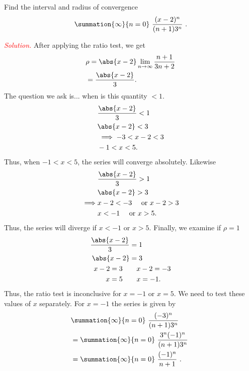 \documentclass{report}
\begin{document}
    \pagebreak \bigbreak \noindent 
    \begin{exm}
        Find the interval and radius of convergence
        \begin{align*}
            \summation{\infty}{n=0}\ \frac{(x-2)^{n}}{(n+1)3^{n}}\ 
        .\end{align*}
    \end{exm}
    \bigbreak \noindent 
    \textcolor{red}{\textit{Solution.}} After applying the ratio test, we get
    \begin{align*}
        &\rho = \abs{x-2}\lim\limits_{n \to \infty}{\frac{n+1}{3n+2}} \\
        &=\frac{\abs{x-2}}{3}
    .\end{align*}
    \bigbreak \noindent 
    The question we ask is... when is this quantity $<1 $. 
    \begin{align*}
        &\frac{\abs{x-2}}{3} < 1 \\
        &\abs{x-2} < 3 \\
        &\implies -3 < x-2 < 3 \\
        &-1 < x < 5
    .\end{align*}
    \bigbreak \noindent 
    Thus, when $-1 < x < 5$, the series will converge absolutely. Likewise
    \begin{align*}
        &\frac{\abs{x-2}}{3} > 1 \\
        &\abs{x-2} > 3 \\
        \implies &x-2 < -3 \quad \text{ or } x-2 > 3 \\
        &x < -1 \quad \text{ or } x > 5
    .\end{align*}
    \bigbreak \noindent 
    Thus, the series will diverge if $x < -1$ or $x > 5$. Finally, we examine if $\rho = 1$
    \begin{align*}
        \frac{\abs{x-2}}{3} &= 1 \\
        \abs{x-2} &= 3 \\
        x-2 = 3 \quad &\quad x-2 = -3 \\
        x=5 \quad &\quad x=-1
    .\end{align*}
    \bigbreak \noindent 
    Thus, the ratio test is inconclusive for $x = -1$ or $x=5$. We need to test these values of $x$ separately. For $x=-1$ the series is given by
    \begin{align*}
        &\summation{\infty}{n=0}\ \frac{(-3)^{n}}{(n+1)3^{n}}\  \\
        &=\summation{\infty}{n=0}\ \frac{3^{n}(-1)^{n}}{(n+1)3^{n}}\  \\
        &=\summation{\infty}{n=0}\ \frac{(-1)^{n}}{n+1}\  
    .\end{align*}
\end{document}
